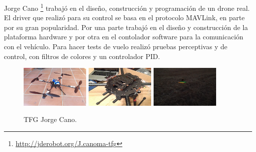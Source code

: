 \hspace{1 cm} Jorge Cano \footnote{\url{http://jderobot.org/J.canoma-tfg}} \cite{MediaWikiJorgeCanoMartinez} trabaj\'o en el diseño, construcci\'on y programaci\'on de un drone real. El driver que realiz\'o para su control se basa en el protocolo MAVLink, en parte por su gran popularidad. Por una parte trabaj\'o en el diseño y construcci\'on de la plataforma hardware y por otra en el contolador software para la comunicaci\'on con el veh\'iculo. Para hacer tests de vuelo realiz\'o pruebas perceptivas y de control, con filtros de colores y un controlador PID.

\begin{figure}[H]
 \centering
    \includegraphics[width=0.3\textwidth]{imgs/JorgeCano1_1.jpg}
    \includegraphics[width=0.3\textwidth]{imgs/JorgeCano2_1.jpg}
    \includegraphics[width=0.3\textwidth]{imgs/JorgeCano3_1.png}
 \caption{TFG Jorge Cano.}
 \label{f:JorgeCano}
\end{figure} 




